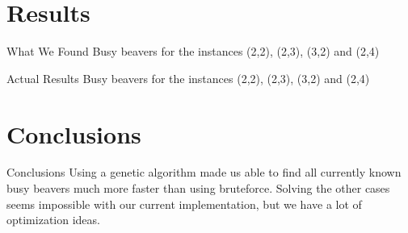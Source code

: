 \documentclass{beamer}
\begin{document}
\section{Results}

\begin{frame}{What We Found}
Busy beavers for the instances (2,2), (2,3), (3,2) and (2,4)
\end{frame}

\begin{frame}{Actual Results}
Busy beavers for the instances (2,2), (2,3), (3,2) and (2,4)
\end{frame}

\section{Conclusions}

\begin{frame}{Conclusions}
Using a genetic algorithm made us able to find all currently known busy beavers much more faster than using bruteforce.
Solving the other cases seems impossible with our current implementation, but we have a lot of optimization ideas.
\end{frame}
\end{document}
